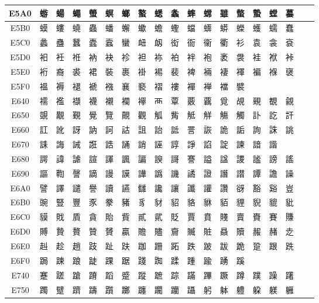 \begin{table}[H]
\begin{tabular}{|Sc|*{16}{>{\centering\arraybackslash}p{1em}|}>{\centering\arraybackslash}p{2.5em}|}
E5A0 & 蝣 & 蝪 & 蠅 & 螢 & 螟 & 螂 & 螯 & 蟋 & 螽 & 蟀 & 蟐 & 雖 & 螫 & 蟄 & 螳 & 蟇 \\ \hline
E5B0 & 蟆 & 螻 & 蟯 & 蟲 & 蟠 & 蠏 & 蠍 & 蟾 & 蟶 & 蟷 & 蠎 & 蟒 & 蠑 & 蠖 & 蠕 & 蠢 \\ \hline
E5C0 & 蠡 & 蠱 & 蠶 & 蠹 & 蠧 & 蠻 & 衄 & 衂 & 衒 & 衙 & 衞 & 衢 & 衫 & 袁 & 衾 & 袞 \\ \hline
E5D0 & 衵 & 衽 & 袵 & 衲 & 袂 & 袗 & 袒 & 袮 & 袙 & 袢 & 袍 & 袤 & 袰 & 袿 & 袱 & 裃 \\ \hline
E5E0 & 裄 & 裔 & 裘 & 裙 & 裝 & 裹 & 褂 & 裼 & 裴 & 裨 & 裲 & 褄 & 褌 & 褊 & 褓 & 襃 \\ \hline
E5F0 & 褞 & 褥 & 褪 & 褫 & 襁 & 襄 & 褻 & 褶 & 褸 & 襌 & 褝 & 襠 & 襞 & & & \\ \hline
E640 & 襦 & 襤 & 襭 & 襪 & 襯 & 襴 & 襷 & 襾 & 覃 & 覈 & 覊 & 覓 & 覘 & 覡 & 覩 & 覦 \\ \hline
E650 & 覬 & 覯 & 覲 & 覺 & 覽 & 覿 & 觀 & 觚 & 觜 & 觝 & 觧 & 觴 & 觸 & 訃 & 訖 & 訐 \\ \hline
E660 & 訌 & 訛 & 訝 & 訥 & 訶 & 詁 & 詛 & 詒 & 詆 & 詈 & 詼 & 詭 & 詬 & 詢 & 誅 & 誂 \\ \hline
E670 & 誄 & 誨 & 誡 & 誑 & 誥 & 誦 & 誚 & 誣 & 諄 & 諍 & 諂 & 諚 & 諫 & 諳 & 諧 & \\ \hline
E680 & 諤 & 諱 & 謔 & 諠 & 諢 & 諷 & 諞 & 諛 & 謌 & 謇 & 謚 & 諡 & 謖 & 謐 & 謗 & 謠 \\ \hline
E690 & 謳 & 鞫 & 謦 & 謫 & 謾 & 謨 & 譁 & 譌 & 譏 & 譎 & 證 & 譖 & 譛 & 譚 & 譫 & 譟 \\ \hline
E6A0 & 譬 & 譯 & 譴 & 譽 & 讀 & 讌 & 讎 & 讒 & 讓 & 讖 & 讙 & 讚 & 谺 & 豁 & 谿 & 豈 \\ \hline
E6B0 & 豌 & 豎 & 豐 & 豕 & 豢 & 豬 & 豸 & 豺 & 貂 & 貉 & 貅 & 貊 & 貍 & 貎 & 貔 & 豼 \\ \hline
E6C0 & 貘 & 戝 & 貭 & 貪 & 貽 & 貲 & 貳 & 貮 & 貶 & 賈 & 賁 & 賤 & 賣 & 賚 & 賽 & 賺 \\ \hline
E6D0 & 賻 & 贄 & 贅 & 贊 & 贇 & 贏 & 贍 & 贐 & 齎 & 贓 & 賍 & 贔 & 贖 & 赧 & 赭 & 赱 \\ \hline
E6E0 & 赳 & 趁 & 趙 & 跂 & 趾 & 趺 & 跏 & 跚 & 跖 & 跌 & 跛 & 跋 & 跪 & 跫 & 跟 & 跣 \\ \hline
E6F0 & 跼 & 踈 & 踉 & 跿 & 踝 & 踞 & 踐 & 踟 & 蹂 & 踵 & 踰 & 踴 & 蹊 & & & \\ \hline
E740 & 蹇 & 蹉 & 蹌 & 蹐 & 蹈 & 蹙 & 蹤 & 蹠 & 踪 & 蹣 & 蹕 & 蹶 & 蹲 & 蹼 & 躁 & 躇 \\ \hline
E750 & 躅 & 躄 & 躋 & 躊 & 躓 & 躑 & 躔 & 躙 & 躪 & 躡 & 躬 & 躰 & 軆 & 躱 & 躾 & 軅 \\ \hline

\end{tabular}
\end{table}
